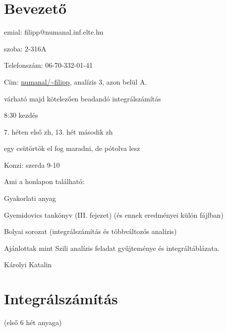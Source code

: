 \documentclass[a4paper,11.5pt]{article}
\begin{document}
	\section{Bevezető}
	\begin{compactitem}
		\item emial: filipp@numanal.inf.elte.hu
		\item szoba: 2-316A
		\item Telefonszám: 06-70-332-01-41
		\item Cím: \url{numanal/~filipp}, analízis 3, azon belül A.
		\item várható majd kötelezően beadandó integrálszámítás
		\item 8:30 kezdés
		\item 7. héten első zh, 13. hét második zh
		\item egy csütörtök el fog maradni, de pótolva lesz
		\item Konzi: szerda 9-10
	\end{compactitem}
	Ami a honlapon található:
	\begin{compactitem}
		\item Gyakorlati anyag
		\item Gyemidovics tankönyv (III. fejezet) (és ennek eredményei külön fájlban)
		\item Bolyai sorozat (integrálszámítás és többváltozós analízis)
		\item Ajánlottak mint Szili analízis feladat gyűjteménye és integráltáblázata.
		\item Károlyi Katalin
	\end{compactitem}
	\section{Integrálszámítás}
	(első 6 hét anyaga)
\end{document}
